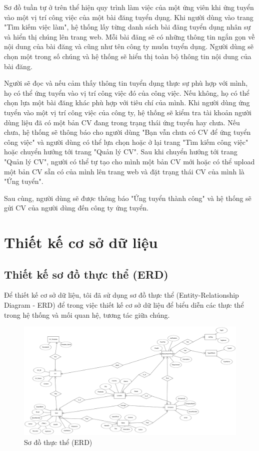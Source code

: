 Sơ đồ tuần tự ở trên thể hiện quy trình làm việc của một ứng viên khi ứng tuyển vào một vị trí công việc của một bài đăng tuyển dụng. Khi người dùng vào trang "Tìm kiếm việc làm", hệ thống lấy từng danh sách bài đăng tuyển dụng nhân sự và hiển thị chúng lên trang web. Mỗi bài đăng sẽ có những thông tin ngắn gọn về nội dung của bài đăng và cũng như tên công ty muốn tuyển dụng. Người dùng sẽ chọn một trong số chúng và hệ thống sẽ hiển thị toàn bộ thông tin nội dung của bài đăng.

Người sẽ đọc và nếu cảm thấy thông tin tuyển dụng thực sự phù hợp với mình, họ có thể ứng tuyển vào vị trí công việc đó của công việc. Nếu không, họ có thể chọn lựa một bài đăng khác phù hợp với tiêu chí của mình. Khi người dùng ứng tuyển vào một vị trí công việc của công ty, hệ thống sẽ kiểm tra tài khoản người dùng liệu đã có một bản CV đang trong trạng thái ứng tuyển hay chưa. Nếu chưa, hệ thống sẽ thông báo cho người dùng "Bạn vẫn chưa có CV để ứng tuyển công việc" và người dùng có thể lựa chọn hoặc ở lại trang "Tìm kiếm công việc" hoặc chuyển hướng tới trang "Quản lý CV". Sau khi chuyển hướng tới trang "Quản lý CV", người có thể tự tạo cho mình một bản CV mới hoặc có thể upload một bản CV sẵn có của mình lên trang web và đặt trạng thái CV của mình là "Ứng tuyển".

Sau cùng, người dùng sẽ được thông báo "Ứng tuyển thành công" và hệ thống sẽ gửi CV của người dùng đến công ty ứng tuyển.

\section{Thiết kế cơ sở dữ liệu}

\subsection{Thiết kế sơ đồ thực thể (ERD)}
Để thiết kế cơ sở dữ liệu, tôi đã sử dụng sơ đồ thực thể (Entity-Relationship Diagram - ERD) để trong việc thiết kế cơ sở dữ liệu để biểu diễn các thực thể trong hệ thống và mối quan hệ, tương tác giữa chúng.

\begin{figure}[H]

	\centering
    \includegraphics[angle=90,scale=0.08]{img/ERD.png}
    \caption{Sơ đồ thực thể (ERD)}
	
\end{figure}

